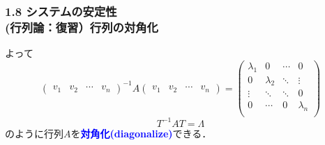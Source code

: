 \documentclass[10pt]{beamer}
\begin{document}
\begin{frame}[t]
\frametitle{1.8 システムの安定性 \\
 (行列論：復習）行列の対角化}
よって
\begin{equation}
 \left(
 \begin{array}{cccc}
  v_1 & v_2 & \cdots & v_n
 \end{array}
 \right)^{-1} A
 \left(
 \begin{array}{cccc}
  v_1 & v_2 & \cdots & v_n
 \end{array}
 \right) =
 \left(
 \begin{array}{cccc}
  \lambda_1 & 0         & \cdots & 0 \\
   0        & \lambda_2 & \ddots & \vdots \\
   \vdots   & \ddots    & \ddots & 0\\
   0        & \cdots    &   0    & \lambda_n \\
 \end{array}
 \right)
\end{equation}
\begin{equation}
  T^{-1}AT =  \Lambda
\end{equation}
のように行列$A$を\textcolor{blue}{\bf {対角化}(diagonalize)}できる．

\end{frame}
\end{document}
